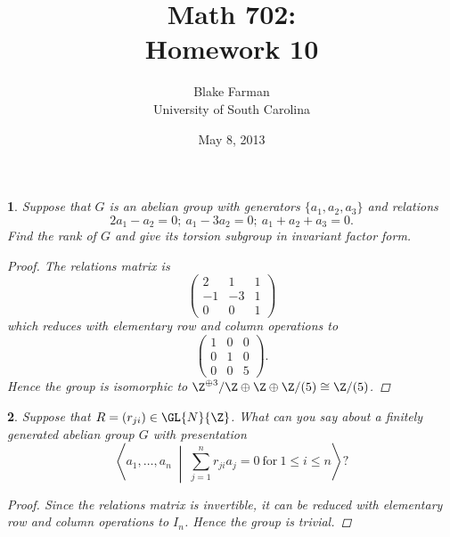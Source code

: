 \documentclass[10pt]{amsart}
\author{Blake Farman\\University of South Carolina}
\title{Math 702:\\Homework 10}
\date{May 8, 2013}
\begin{document}
\maketitle

\providecommand{\p}{\mathfrak{p}}
\providecommand{\m}{\mathfrak{m}}

\newtheorem{thm}{}
\newtheorem{lem}{Lemma}

\begin{thm}
  Suppose that $G$ is an abelian group with generators $\{a_1, a_2, a_3\}$ and relations
  $$2a_1 - a_2 = 0;\ a_1 - 3a_2 = 0;\ a_1 + a_2 + a_3 = 0.$$
  Find the rank of $G$ and give its torsion subgroup in invariant factor form.
  \begin{proof}
    The relations matrix is 
    $$\left(
    \begin{array}{ccc}
      2 & 1 & 1\\
      -1 & -3 & 1\\
      0 & 0 & 1
    \end{array}\right)
    $$
    which reduces with elementary row and column operations to 
    $$\left(
    \begin{array}{ccc}
      1 & 0 & 0\\
      0 & 1 & 0\\
      0 & 0 & 5
    \end{array}\right).
    $$
    Hence the group is isomorphic to $\Z^{\oplus3}/\Z \oplus \Z \oplus \Z/(5)\cong \Z/(5)$.
  \end{proof}
\end{thm}  

\begin{thm}
  Suppose that $R = (r_{ji}) \in \GL{N}{\Z}$.
  What can you say about a finitely generated abelian group $G$ with presentation
  $$\left< a_1, \ldots, a_n \;\middle\vert\; \sum_{j = 1}^n r_{ji}a_j = 0\ \text{for}\ 1 \leq i \leq n \right>?$$
  
  \begin{proof}
    Since the relations matrix is invertible, it can be reduced with elementary row and column operations to $I_n$.
    Hence the group is trivial.
  \end{proof}
\end{thm}  
\end{document}
